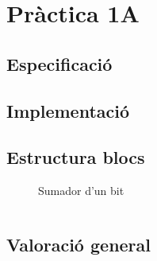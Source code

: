 \chapter{Pràctica 1A}

\section{Especificació}

\section{Implementació}

\section{Estructura blocs}

\begin{figure}
\caption{Sumador d'un bit}
\end{figure}

\inputminted{vhdl}{../assets/vhdl/bcd7seg.vhd}

\section{Valoració general}

